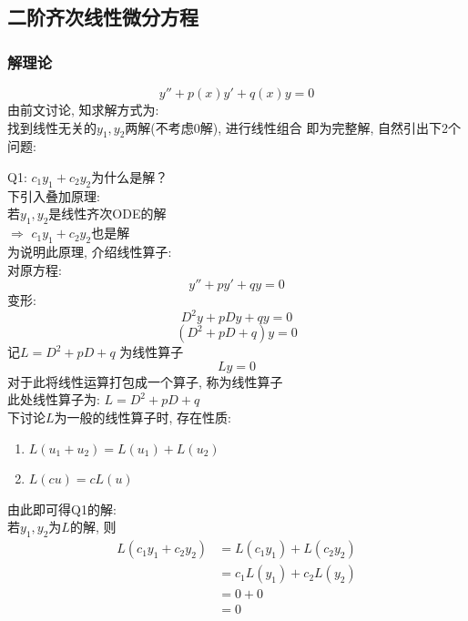 \subsection{\LARGE 二阶齐次线性微分方程}
\subsubsection{\large 解理论}
{\Large \[ y'' + p(x) y' + q(x) y = 0 \] }
由前文讨论, 知求解方式为:\\
找到线性无关的$y_1, y_2$两解(不考虑$0$解), 进行线性组合
即为完整解, 自然引出下2个问题:


Q1: $c_1 y_1 + c_2 y_2$为什么是解？\\
下引入叠加原理:\\
若$y_1, y_2$是线性齐次ODE的解\\
$\Longrightarrow $  $c_1 y_1 + c_2 y_2$也是解\\
为说明此原理, 介绍线性算子:\\
对原方程:
\[ y'' + p y' + q y = 0 \]
变形:
\[ D^2 y + p D y + q y = 0 \]
\[ (D^2 + p D + q) y = 0 \]
记$L = D^2 + p D + q$ 为线性算子
\[ L y = 0 \]
对于此将线性运算打包成一个算子, 称为线性算子\\
此处线性算子为: $L = D^2 + p D + q$\\
下讨论$L$为一般的线性算子时, 存在性质:
\begin{enumerate}
    \item $L(u_1 + u_2) = L(u_1) + L(u_2)$
    \item $L (cu) = c L(u)$
\end{enumerate}
由此即可得Q1的解:\\
若$y_1,y_2$为$L$的解, 则
\begin{align*}
    L(c_1 y_1 + c_2 y_2) &= L(c_1 y_1) + L(c_2 y_2) \\
         &= c_1 L(y_1) + c_2 L(y_2)\\
         &= 0 + 0 \\
         &= 0
\end{align*}

